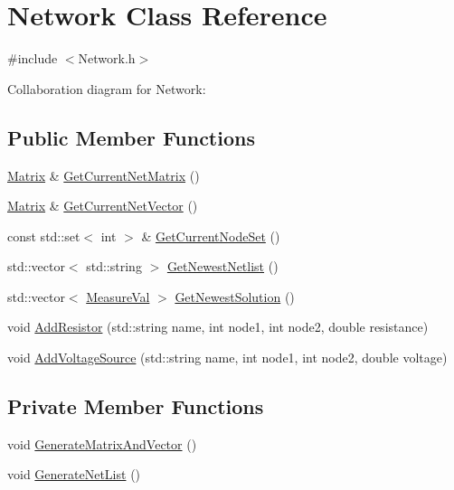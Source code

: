 \hypertarget{classNetwork}{}\section{Network Class Reference}
\label{classNetwork}


{\ttfamily \#include $<$Network.\+h$>$}



Collaboration diagram for Network\+:
\subsection*{Public Member Functions}
\begin{DoxyCompactItemize}
\item 
\hyperlink{classMatrix}{Matrix} \& \hyperlink{classNetwork_a0d542d208520c286e5418267525c183d}{Get\+Current\+Net\+Matrix} ()
\item 
\hyperlink{classMatrix}{Matrix} \& \hyperlink{classNetwork_a14a99e68dac334d31c127032b24cee0c}{Get\+Current\+Net\+Vector} ()
\item 
const std\+::set$<$ int $>$ \& \hyperlink{classNetwork_a355e3ef39f7178851cb230846d616cef}{Get\+Current\+Node\+Set} ()
\item 
std\+::vector$<$ std\+::string $>$ \hyperlink{classNetwork_addae3802a581406208810ce430a045f9}{Get\+Newest\+Netlist} ()
\item 
std\+::vector$<$ \hyperlink{structMeasureVal}{Measure\+Val} $>$ \hyperlink{classNetwork_ab22eeab7f44269316967f14c0ad7b063}{Get\+Newest\+Solution} ()
\item 
void \hyperlink{classNetwork_a110bd81c8a0ace8eca270ffd12cff58a}{Add\+Resistor} (std\+::string name, int node1, int node2, double resistance)
\item 
void \hyperlink{classNetwork_a28d48c202d27f3f319ef1a837ab05974}{Add\+Voltage\+Source} (std\+::string name, int node1, int node2, double voltage)
\end{DoxyCompactItemize}
\subsection*{Private Member Functions}
\begin{DoxyCompactItemize}
\item 
void \hyperlink{classNetwork_af68724676fb5a5e1fdba8b82b5f0d0e5}{Generate\+Matrix\+And\+Vector} ()
\item 
void \hyperlink{classNetwork_a783abf2a3cb51f088682796304a988ff}{Generate\+Net\+List} ()
\end{DoxyCompactItemize}
